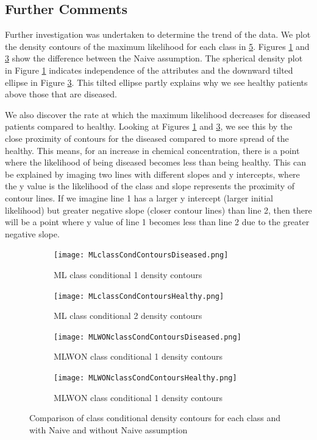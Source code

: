 {\subsection{Further Comments}
Further investigation was undertaken to determine the trend of the data. We plot the density contours of the maximum likelihood for each class in \ref{fig:CMLdens}. Figures \ref{fig:cml1} and \ref{fig:cml3} show the difference between the Naive assumption. The spherical density plot in Figure \ref{fig:cml1} indicates independence of the attributes and the downward tilted ellipse in Figure \ref{fig:cml3}. This tilted ellipse partly explains why we see healthy patients above those that are diseased. 

We also discover the rate at which the maximum likelihood decreases for diseased patients compared to healthy. Looking at Figures \ref{fig:cml1} and \ref{fig:cml3}, we see this by the close proximity of contours for the diseased compared to more spread of the healthy. This means, for an increase in chemical concentration, there is a point where the likelihood of being diseased becomes less than being healthy. This can be explained by imaging two lines with different slopes and y intercepts, where the y value is the likelihood of the class and slope represents the proximity of contour lines. If we imagine line 1 has a larger y intercept (larger initial likelihood) but greater negative slope (closer contour lines) than line 2, then there will be a point where y value of line 1 becomes less than line 2 due to the greater negative slope. 

\begin{figure}[h!] 
	\centering
	\begin{subfigure}[b]{.40\textwidth}
		\texttt{[image: MLclassCondContoursDiseased.png]}
		\caption{ML class conditional 1 density contours}
		\label{fig:cml1}
	\end{subfigure}
	\begin{subfigure}[b]{.40\textwidth}
		\texttt{[image: MLclassCondContoursHealthy.png]}
		\caption{ML class conditional 2 density contours}
		\label{fig:cml2}
	\end{subfigure}
	\begin{subfigure}[b]{.40\textwidth}
		\texttt{[image: MLWONclassCondContoursDiseased.png]}
		\caption{MLWON class conditional 1 density contours}
		\label{fig:cml3}
	\end{subfigure}
	\begin{subfigure}[b]{.40\textwidth}
		\texttt{[image: MLWONclassCondContoursHealthy.png]}
		\caption{MLWON class conditional 1 density contours}
		\label{fig:cml4}
	\end{subfigure}
	\caption{Comparison of class conditional density contours for each class and with Naive and without Naive assumption}
	\label{fig:CMLdens}
\end{figure}

}
